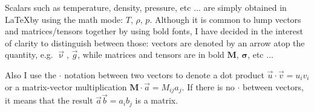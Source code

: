Scalars such as temperature, density, pressure, etc ... are simply 
obtained in \LaTeX by using the math mode: $T$, $\rho$, $p$.
Although it is common to lump vectors and matrices/tensors together
by using bold fonts, I have decided in the interest of clarity to 
distinguish between those: vectors are denoted by an arrow 
atop the quantity, e.g. $\vec \upnu$, $\vec g$, while matrices 
and tensors are in bold $\bm M$, $\bm \sigma$, etc ...

Also I use the $\cdot$ notation between two vectors to denote a 
dot product $\vec u \cdot \vec v = u_iv_i$ or a matrix-vector
multiplication ${\bm M}\cdot \vec a = M_{ij}a_j$. If there is no
$\cdot$ between vectors, it means that the result 
$\vec a \vec b = a_ib_j$ is a matrix.


